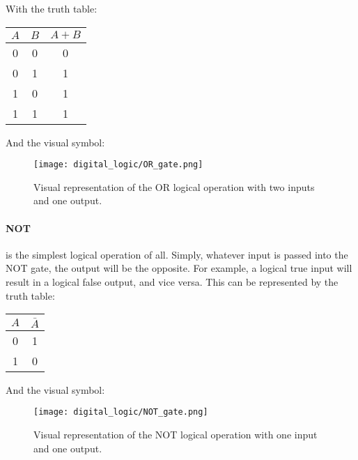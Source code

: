     With the truth table:
    \begin{table}[h!]
        \begin{tabular}{c c | c}
            \toprule
            $A$ & $B$ & $A+B$  \\
            \midrule
             0  &  0  &   0    \\
             0  &  1  &   1    \\
             1  &  0  &   1    \\
             1  &  1  &   1    \\
            \bottomrule
        \end{tabular}
    \end{table}

    And the visual symbol:
    \begin{figure}[h!]
        \texttt{[image: digital\_logic/OR\_gate.png]}
        \caption[OR Gate]{Visual representation of the OR logical operation with two inputs and one output.}
    \end{figure}

    \paragraph*{NOT} is the simplest logical operation of all.
    Simply, whatever input is passed into the NOT gate, the output will be the opposite.
    For example, a logical true input will result in a logical false output, and vice versa.
    This can be represented by the truth table:
    
    \begin{table}[h!]
        \begin{tabular}{c | c}
            \toprule
            $A$ & $\bar{A}$  \\
            \midrule
             0  &    1    \\
             1  &    0    \\
            \bottomrule
        \end{tabular}
    \end{table}

    And the visual symbol:
    \begin{figure}[h!]
        \texttt{[image: digital\_logic/NOT\_gate.png]}
        \caption[NOT Gate]{Visual representation of the NOT logical operation with one input and one output.}
    \end{figure}

